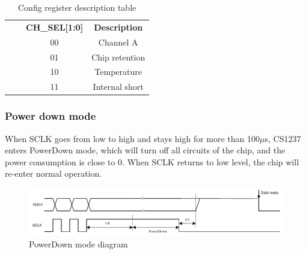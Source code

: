 \documentclass{article}
\begin{document}
\begin{table}[h]
{\begin{tabular}{|c|c|c|c|}
            \cline{3-4}
                & & \textbf{CH\_SEL[1:0]} & \textbf{Description} \\
            \cline{3-4}
                & & 00 & Channel A \\
            \cline{3-4}
                & & 01 & Chip retention \\
            \cline{3-4}
                & & 10 & Temperature \\
            \cline{3-4}
                & & 11 & Internal short \\
        \hline 
    \end{tabular}}
    \caption{Config register description table}
    \label{tab:table11}
\end{table}

\pagebreak

\subsubsection{Power down mode}

When SCLK goes from low to high and stays high for more than 100$\mu$s, CS1237 enters PowerDown mode, which will turn off all circuits of the chip, and the power consumption is close to 0.
When SCLK returns to low level, the chip will re-enter normal operation.

\begin{figure}[h]
    \centering
    \includegraphics[width=1\textwidth]{fig10.png}
    \caption{PowerDown mode diagram}
    \label{fig:fig10}
\end{figure}

\begin{table}[h]
    \label{tab:finaltable}
\end{table}
\end{document}
